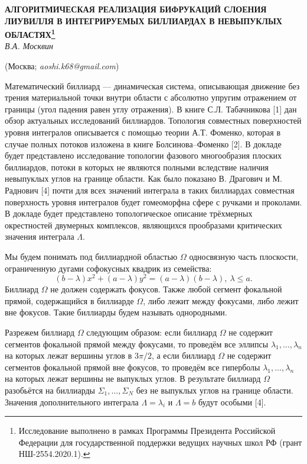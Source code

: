 
\begin{center}
    {\bf АЛГОРИТМИЧЕСКАЯ РЕАЛИЗАЦИЯ БИФРУКАЦИЙ СЛОЕНИЯ ЛИУВИЛЛЯ В ИНТЕГРИРУЕМЫХ
    	БИЛЛИАРДАХ В НЕВЫПУКЛЫХ ОБЛАСТЯХ\footnote{Исследование выполнено в рамках Программы Президента Российской Федерации для государственной поддержки ведущих научных школ РФ (грант НШ-2554.2020.1).}}\\

    {\it В.А. Москвин}

    (Москва; {\it aoshi.k68@gmail.com})
\end{center}

Математический биллиард --- динамическая система, опи\-сы\-вающая движение без трения материальной точки внутри области с абсолютно упругим отражением от границы (угол падения равен углу отражения). В книге С.Л. Табач\-никова [1] дан обзор актуальных исследований биллиардов. Тополо\-гия совместных поверхностей уровня интег\-ралов опи\-сывается с помощью теории А.Т. Фоменко, которая в случае полных потоков изло\-жена в книге Болсинова--Фоменко [2]. В докладе будет пред\-став\-лено ис\-следование топологии фазового много\-образия плос\-ких бил\-лиардов, потоки в которых не являются полными вследствие наличия не\-выпук\-лых углов на границе области. Как было показано В. Драгович и М. Раднович [4] почти для всех значений интеграла в таких биллиардах совместная поверхность уровня интегралов будет гомеоморфна сфере с ручками и проколами. В докладе будет пред\-ставлено топ\-олог\-ичес\-кое описание трёхмерных ок\-рест\-ностей дву\-мерных ком\-плек\-сов, являющихся прообразами критичес\-ких значения интеграла $\Lambda$.


Мы будем понимать под биллиардной областью $\Omega$ однос\-вязную часть плоскости, ограниченную дугами софокусных квадрик из семейства:
$$(b-\lambda)x^2+(a-\lambda)y^2=(a-\lambda)(b-\lambda),~\lambda \leq a. $$
Биллиард $\Omega$ не должен содержать фокусов. Также любой сегмент фокальной прямой, содержащийся в биллиарде $\Omega$, либо лежит между фокусами, либо лежит вне фокусов. Такие биллиарды будем называть однородными.

Разрежем биллиард $\Omega$ следующим образом: если биллиард  $\Omega$ не содержит сегментов фокальной прямой между фокусами, то проведём все эллипсы $\lambda_1, \ldots, \lambda_n$ на которых лежат вершины углов в $3\pi/2$, а если биллиард $\Omega$ не содержит сегментов фокальной прямой вне фокусов, то проведём все гиперболы $\lambda_1, \ldots, \lambda_n$ на которых лежат вершины не выпуклых углов. В результате биллиард $\Omega$ разобьётся на биллиарды $\Sigma_1, \ldots, \Sigma_N$ без не выпуклых углов на границе области. Значения допол\-нитель\-ного интеграла $\Lambda = \lambda_i$ и $\Lambda = b$ будут особыми [4].

